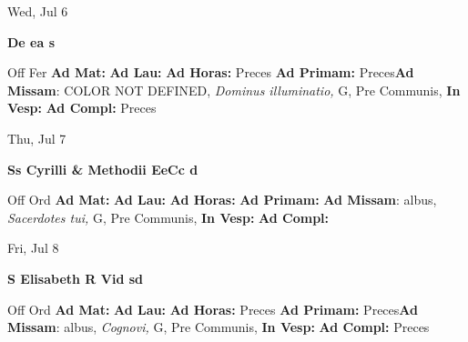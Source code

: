 \documentclass[10pt]{memoir}
\begin{document}
\begin{center}
\begin{minipage}{3.5in}
\vspace{2em}
\begin{center}Wed, Jul 6
\end{center}
\textbf{ \large De ea
\textnormal{\normalsize s}}

\begin{justify}Off Fer
\textbf{Ad Mat: }
\textbf{Ad Lau: }
\textbf{Ad Horas: }Preces
\textbf{Ad Primam: }Preces\textbf{Ad Missam}: COLOR NOT DEFINED, \textit{Dominus illuminatio,} G, Pre Communis, 
\textbf{In Vesp: }
\textbf{Ad Compl: }Preces
\end{justify}
\end{minipage}
\end{center}

\begin{center}
\begin{minipage}{3.5in}
\vspace{2em}
\begin{center}Thu, Jul 7
\end{center}
\textbf{ \large Ss Cyrilli \& Methodii EeCc
\textnormal{\normalsize d}}

\begin{justify}Off Ord
\textbf{Ad Mat: }
\textbf{Ad Lau: }
\textbf{Ad Horas: }
\textbf{Ad Primam: }\textbf{Ad Missam}: albus, \textit{Sacerdotes tui,} G, Pre Communis, 
\textbf{In Vesp: }
\textbf{Ad Compl: }
\end{justify}
\end{minipage}
\end{center}

\begin{center}
\begin{minipage}{3.5in}
\vspace{2em}
\begin{center}Fri, Jul 8
\end{center}
\textbf{ \large S Elisabeth R Vid
\textnormal{\normalsize sd}}

\begin{justify}Off Ord
\textbf{Ad Mat: }
\textbf{Ad Lau: }
\textbf{Ad Horas: }Preces
\textbf{Ad Primam: }Preces\textbf{Ad Missam}: albus, \textit{Cognovi,} G, Pre Communis, 
\textbf{In Vesp: }
\textbf{Ad Compl: }Preces
\end{justify}
\end{minipage}
\end{center}
\end{document}
